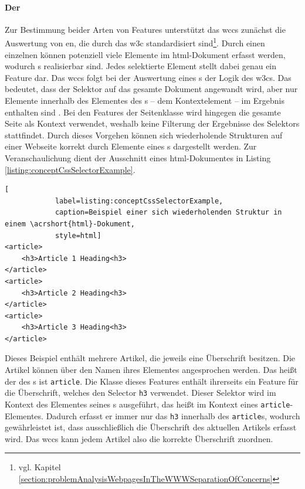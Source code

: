         \paragraph{Der \cssSelector}
        Zur Bestimmung beider Arten von Features unterstützt das \gls{wccs} zunächst
        die Auswertung von {\cssSelector}en, die durch das \gls{w3c} standardisiert
        sind\footnote{vgl. Kapitel \ref{section:problemAnalysisWebpagesInTheWWWSeparationOfConcerns}}.
        Durch einen einzelnen {\cssSelector} können potenziell viele Elemente im \gls{html}-Dokument
        erfasst werden, wodurch {\collectionFeature}s realisierbar sind.
        Jedes selektierte Element stellt dabei genau ein Feature dar.
        Das \gls{wccs} folgt bei der Auswertung eines {\cssSelector}s der Logik des \glspl{w3c}.
        Das bedeutet, dass der Selektor auf das gesamte Dokument angewandt wird,
        aber nur Elemente innerhalb des Elementes des {\parentFeature}s -- dem Kontextelement --
        im Ergebnis enthalten sind \cite{w3c:selectorsAPI}.
        Bei den Features der Seitenklasse wird hingegen die gesamte Seite als Kontext verwendet,
        weshalb keine Filterung der Ergebnisse des Selektors stattfindet.
        Durch dieses Vorgehen können sich wiederholende Strukturen auf einer Webseite
        korrekt durch Elemente eines {\collectionFeature}s dargestellt werden.
        Zur Veranschaulichung dient der Ausschnitt eines \gls{html}-Dokumentes
        in Listing \ref{listing:conceptCssSelectorExample}.

        \begin{lstlisting}[
            label=listing:conceptCssSelectorExample,
            caption=Beispiel einer sich wiederholenden Struktur in einem \acrshort{html}-Dokument,
            style=html]
<article>
    <h3>Article 1 Heading<h3>
</article>
<article>
    <h3>Article 2 Heading<h3>
</article>
<article>
    <h3>Article 3 Heading<h3>
</article>
        \end{lstlisting}

        Dieses Beispiel enthält mehrere Artikel, die jeweils eine Überschrift besitzen.
        Die Artikel können über den Namen ihres Elementes angesprochen werden.
        Das heißt der {\cssSelector} des {\collectionFeature}s ist \texttt{article}.
        Die Klasse dieses Features enthält ihrerseits ein Feature für die Überschrift,
        welches den Selector \texttt{h3} verwendet.
        Dieser Selektor wird im Kontext des Elementes seines {\parentFeature}s ausgeführt,
        das heißt im Kontext eines \texttt{article}-Elementes.
        Dadurch erfasst er immer nur das \texttt{h3} innerhalb des \texttt{article}s,
        wodurch gewährleistet ist, dass ausschließlich die Überschrift des aktuellen Artikels erfasst wird.
        Das \gls{wccs} kann jedem Artikel also die korrekte Überschrift zuordnen.


